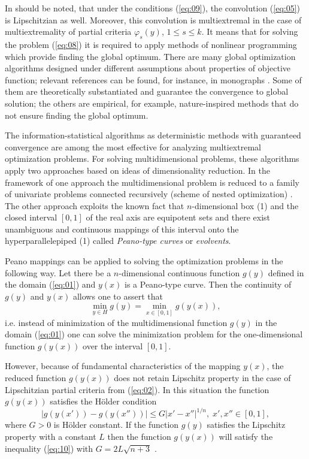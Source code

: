 \documentclass[runningheads]{llncs}
\begin{document}
In should be noted, that under the conditions (\ref{eq:09}), the convolution (\ref{eq:05}) is Lipschitzian as well. Moreover, this convolution is multiextremal in the case of multiextremality of partial criteria $\varphi_s(y)$, $1 \leq s \leq k$. It means that for solving the problem (\ref{eq:08}) it is required to apply methods of nonlinear programming which provide finding the global optimum. There are many global optimization algorithms designed under different assumptions about properties of objective function; relevant references can be found, for instance, in monographs \cite{Pardalos2017,Marler2009,Sergeyev2013}. Some of them are theoretically substantiated and guarantee the convergence to global solution; the others are empirical, for example, nature-inspired methods that do not ensure finding the global optimum. 

The information-statistical algorithms \cite{Gergel2018,Barkalov2018,Strongin2003}  as deterministic methods with guaranteed convergence are among the most effective for analyzing multiextremal optimization problems. For solving multidimensional problems, these algorithms apply two approaches based on ideas of dimensionality reduction. In the framework of one approach the multidimensional problem is reduced to a family of univariate problems connected recursively (scheme of nested optimization) \cite{Gergel2019_2}. The other approach \cite{Gergel2018,Sergeyev2013} exploits the known fact that $n$-dimensional box (1) and the closed interval $[0,1]$ of the real axis are equipotent sets and there exist unambiguous and continuous mappings of this interval onto the hyperparallelepiped (1) called \textit{Peano-type curves} or \textit{evolvents}.

Peano mappings can be applied to solving the optimization problems in the following way. Let there be a $n$-dimensional continuous function $g(y)$ defined in the domain (\ref{eq:01}) and $y(x)$ is a Peano-type curve. Then the continuity of $g(y)$ and $y(x)$ allows one to assert that
\begin{equation}
    \min_{y\in H} g(y) = \min_{x\in[0,1]} g(y(x)),
\end{equation}
i.e. instead of minimization of the multidimensional function $g(y)$ in the domain (\ref{eq:01}) one can solve the minimization problem for the one-dimensional function $g(y(x))$ over the interval $[0,1]$.

However, because of fundamental characteristics of the mapping $y(x)$, the reduced function $g(y(x))$ does not retain Lipschitz property in the case of Lipschitzian partial criteria from (\ref{eq:02}). In this situation the function $g(y(x))$ satisfies the H{\" o}lder condition 
\begin{equation}
    \label{eq:10}
    |g(y(x')) - g(y(x''))| \leq G \left|x'-x''\right|^{1/n}, \; x', x'' \in [0,1],
\end{equation}
where $G>0$ is H{\" o}lder constant. If the function $g(y)$ satisfies the Lipschitz property with a constant $L$ then the function $g(y(x))$ will satisfy the inequality (\ref{eq:10}) with $G=2L\sqrt{n+3}$ \cite{Strongin2003,Sergeyev2013}.
\end{document}
